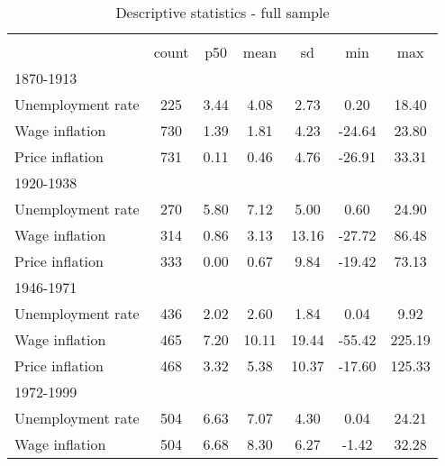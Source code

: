 \begin{table}[htbp]\centering
\def\sym#1{\ifmmode^{#1}\else\(^{#1}\)\fi}
\caption{Descriptive statistics - full sample \label{T:Descriptives-Full}}
\begin{tabular}{l*{1}{cccccc}}
\hline\hline
                    &\multicolumn{6}{c}{}                                                         \\
                    &       count&         p50&        mean&          sd&         min&         max\\
\hline
1870-1913           &            &            &            &            &            &            \\
Unemployment rate   &         225&        3.44&        4.08&        2.73&        0.20&       18.40\\
Wage inflation      &         730&        1.39&        1.81&        4.23&      -24.64&       23.80\\
Price inflation     &         731&        0.11&        0.46&        4.76&      -26.91&       33.31\\
\hline
1920-1938           &            &            &            &            &            &            \\
Unemployment rate   &         270&        5.80&        7.12&        5.00&        0.60&       24.90\\
Wage inflation      &         314&        0.86&        3.13&       13.16&      -27.72&       86.48\\
Price inflation     &         333&        0.00&        0.67&        9.84&      -19.42&       73.13\\
\hline
1946-1971           &            &            &            &            &            &            \\
Unemployment rate   &         436&        2.02&        2.60&        1.84&        0.04&        9.92\\
Wage inflation      &         465&        7.20&       10.11&       19.44&      -55.42&      225.19\\
Price inflation     &         468&        3.32&        5.38&       10.37&      -17.60&      125.33\\
\hline
1972-1999           &            &            &            &            &            &            \\
Unemployment rate   &         504&        6.63&        7.07&        4.30&        0.04&       24.21\\
Wage inflation      &         504&        6.68&        8.30&        6.27&       -1.42&       32.28\\

\end{tabular}
\end{table}

